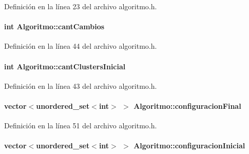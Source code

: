 Definición en la línea 23 del archivo algoritmo.\-h.

\hypertarget{class_algoritmo_a4b3baaedefed9ee655a1d1819b78a5df}{
\paragraph[{cant\-Cambios}]{\setlength{\rightskip}{0pt plus 5cm}int Algoritmo\-::cant\-Cambios\hspace{0.3cm}{\ttfamily [private]}}}\label{class_algoritmo_a4b3baaedefed9ee655a1d1819b78a5df}


Definición en la línea 44 del archivo algoritmo.\-h.

\hypertarget{class_algoritmo_a740325de9f0e126452afbf5bce34bbc7}{
\paragraph[{cant\-Clusters\-Inicial}]{\setlength{\rightskip}{0pt plus 5cm}int Algoritmo\-::cant\-Clusters\-Inicial\hspace{0.3cm}{\ttfamily [private]}}}\label{class_algoritmo_a740325de9f0e126452afbf5bce34bbc7}


Definición en la línea 43 del archivo algoritmo.\-h.

\hypertarget{class_algoritmo_ac1129d6d9bc8bc6e731b0ad24ecb799a}{
\paragraph[{configuracion\-Final}]{\setlength{\rightskip}{0pt plus 5cm}vector$<$unordered\-\_\-set$<$int$>$ $>$ Algoritmo\-::configuracion\-Final\hspace{0.3cm}{\ttfamily [private]}}}\label{class_algoritmo_ac1129d6d9bc8bc6e731b0ad24ecb799a}


Definición en la línea 51 del archivo algoritmo.\-h.

\hypertarget{class_algoritmo_a12d991b910cdf5383a53b1b7c12bad40}{
\paragraph[{configuracion\-Inicial}]{\setlength{\rightskip}{0pt plus 5cm}vector$<$unordered\-\_\-set$<$int$>$ $>$ Algoritmo\-::configuracion\-Inicial\hspace{0.3cm}{\ttfamily [private]}}}\label{class_algoritmo_a12d991b910cdf5383a53b1b7c12bad40}


